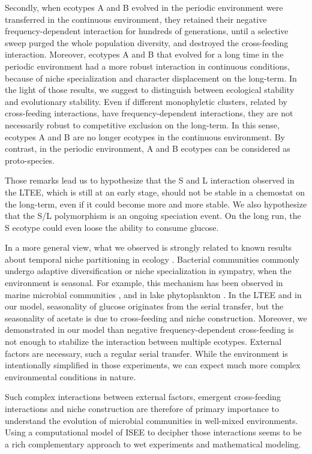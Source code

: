 Secondly, when ecotypes A and B evolved in the periodic environment were transferred in the continuous environment, they retained their negative frequency-dependent interaction for hundreds of generations, until a selective sweep purged the whole population diversity, and destroyed the cross-feeding interaction. Moreover, ecotypes A and B that evolved for a long time in the periodic environment had a more robust interaction in continuous conditions, because of niche specialization and character displacement on the long-term. In the light of those results, we suggest to distinguish between ecological stability and evolutionary stability. Even if different monophyletic clusters, related by cross-feeding interactions, have frequency-dependent interactions, they are not necessarily robust to competitive exclusion on the long-term. In this sense, ecotypes A and B are no longer ecotypes in the continuous environment. By contrast, in the periodic environment, A and B ecotypes can be considered as proto-species.

Those remarks lead us to hypothesize that the S and L interaction observed in the LTEE, which is still at an early stage, should not be stable in a chemostat on the long-term, even if it could become more and more stable. We also hypothesize that the S/L polymorphism is an ongoing speciation event. On the long run, the S ecotype could even loose the ability to consume glucose.

In a more general view, what we observed is strongly related to known results about temporal niche partitioning in ecology \citep{spencer-et-al-2007}. Bacterial communities commonly undergo adaptive diversification or niche specialization in sympatry, when the environment is seasonal. For example, this mechanism has been observed in marine microbial communities \citep{gilbert-et-al-2012}, and in lake phytoplankton \citep{grover-1988}. In the LTEE \citep{rozen-et-al-2009} and in our model, seasonality of glucose originates from the serial transfer, but the seasonality of acetate is due to cross-feeding and niche construction. Moreover, we demonstrated in our model than negative frequency-dependent cross-feeding is not enough to stabilize the interaction between multiple ecotypes. External factors are necessary, such a regular serial transfer. While the environment is intentionally simplified in those experiments, we can expect much more complex environmental conditions in nature.

Such complex interactions between external factors, emergent cross-feeding interactions and niche construction are therefore of primary importance to understand the evolution of microbial communities in well-mixed environments. Using a computational model of ISEE to decipher those interactions seems to be a rich complementary approach to wet experiments and mathematical modeling.

